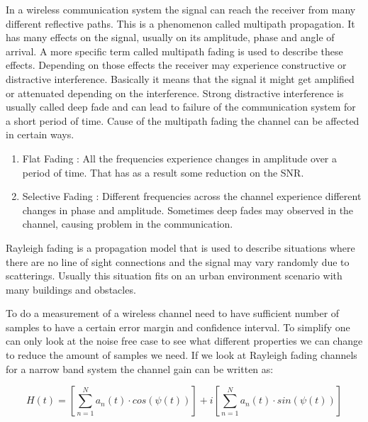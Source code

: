 In a wireless communication system the signal can reach the receiver from many different reflective paths. This is a phenomenon called multipath propagation. It has many effects on the signal, usually on its amplitude, phase and angle of arrival.\citep{Fading} A more specific term called multipath fading is used to describe these effects. Depending on those effects the receiver may experience constructive or distractive interference. Basically it means that the signal it might get amplified or attenuated depending on the interference. Strong distractive interference is usually called deep fade and can lead to failure of the communication system for a short period of time. Cause of the multipath fading the channel can be affected in certain ways.
	\begin{enumerate}
	\item Flat Fading : All the frequencies experience changes in amplitude over a period of time. That has as a result some reduction on the SNR.
	\item Selective Fading : Different frequencies across the channel experience different changes in phase and amplitude. Sometimes deep fades may observed in the channel, causing problem in the communication.\citep{FlatSelective}
	\end{enumerate}
Rayleigh fading is a propagation model that is used to describe situations where there are no line of sight connections and the signal may vary randomly due to scatterings. Usually this situation fits on an urban environment scenario with many buildings and obstacles.

To do a measurement of a wireless channel need to have sufficient number of samples to have a certain error margin and confidence interval. To simplify one can only look at  the noise free case to see what different properties we can change to reduce the amount of samples we need. 
If we look at Rayleigh fading channels for a narrow band system the channel gain can be written as:

\begin{equation}
H(t) = \left [ \sum_{n =1}^{N} a_n(t)\cdot cos(\psi (t))\right ] + i\left [\sum_{n =1}^{N} a_n(t)\cdot sin(\psi (t))  \right ]
\end{equation}

